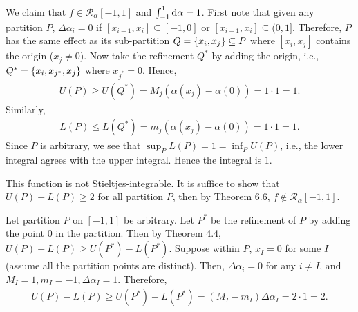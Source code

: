 \documentclass[12pt]{article}
\begin{document}
\begin{fproof}[4(b)]
  We claim that \(f \in \mathcal{R}_{\alpha}[-1,1]\) and \(\int_{-1}^{1} \mathop{}\!\mathrm{d}\alpha = 1\).
  First note that given any partition \(P\), \(\Delta \alpha_i = 0\) if \([x_{i-1}, x_i] \subseteq [-1,0]\) or \([x_{i-1}, x_i] \subseteq (0,1]\).
  Therefore, \(P\) has the same effect as its sub-partition \(Q = \left\{ x_i, x_j \right\} \subseteq P\) where \([x_i,x_j]\) contains the origin (\(x_j \neq 0\)).
  Now take the refinement \(Q^*\) by adding the origin, i.e., \(Q^* = \left\{ x_i, x_{j^*}, x_j \right\}\) where \(x_{j^*} = 0\).
  Hence,
  \begin{align*}
    U(P) \geq U(Q^*) = M_j(\alpha(x_j) - \alpha(0)) = 1 \cdot 1 = 1.
  \end{align*}
  Similarly,
  \begin{align*}
    L(P) \leq L(Q^*) = m_j(\alpha(x_j) - \alpha(0)) = 1 \cdot 1 = 1.
  \end{align*}
  Since \(P\) is arbitrary, we see that \(\sup_P L(P) = 1 = \inf_P U(P)\), i.e., the lower integral agrees with the upper integral. Hence the integral is \(1\).
\end{fproof}

\begin{fproof}[4(c)]
  This function is not Stieltjes-integrable.
  It is suffice to show that \(U(P) - L(P) \geq 2\) for all partition \(P\), then by Theorem 6.6, \(f \notin \mathcal{R}_{\alpha}[-1,1]\).
  
  Let partition \(P\) on \([-1,1]\) be arbitrary. Let \(P^*\) be the refinement of \(P\) by adding the point \(0\) in the partition.
  Then by Theorem 4.4, \(U(P) - L(P) \geq U(P^*) - L(P^*)\).
  Suppose within \(P\), \(x_{I} = 0\) for some \(I\) (assume all the partition points are distinct).
  Then, \(\Delta \alpha_i = 0\) for any \(i \neq I\), and \(M_I = 1, m_I = -1, \Delta \alpha_I = 1\).
  Therefore,
  \begin{align*}
    U(P) - L(P) \geq U(P^*) - L(P^*) = (M_I - m_I) \Delta \alpha_I = 2 \cdot 1 = 2.
  \end{align*}
\end{fproof}
\end{document}
